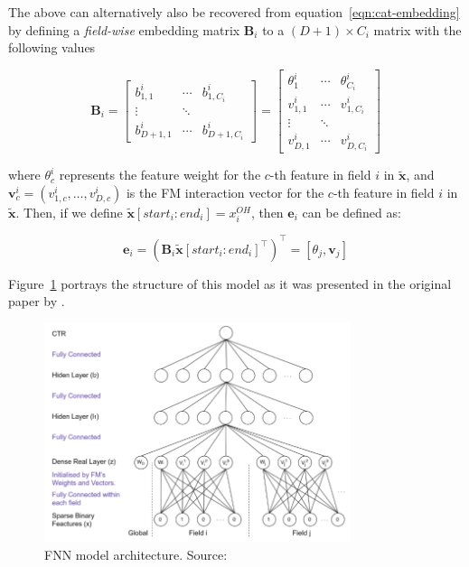 \documentclass{mldsmsc}
\begin{document}
The above can alternatively also be recovered from equation~\ref{eqn:cat-embedding} by
defining a \emph{field-wise} embedding matrix $\mathbf{B}_i$ to a $(D+1) \times C_i$ matrix with the following
values

\begin{equation*}
\mathbf{B}_i = \begin{bmatrix}
    b_{1,1}^i & \cdots & b_{1 ,C_i}^i\\
    \vdots & \ddots & \\
    b_{D+1, 1}^i & \cdots & b_{D+1, C_i}^i
    \end{bmatrix}
= \begin{bmatrix}
    \theta_{1}^{i} & \cdots & \theta_{C_i}^{i}\\
    v_{1,1}^i & \cdots & v_{1,C_i}^i \\
    \vdots & \ddots & \\
    v_{D,1}^{i
    }& \cdots & v_{D,C_i}^{i}
    \end{bmatrix}
\end{equation*}

where $\theta_{c}^i$ represents the feature weight for the $c$-th feature in field $i$ in $\tilde{\mathbf{x}}$,
and $\mathbf{v}_{c}^i = \left(v_{1,c}^i, \ldots, v_{D,c}^i\right)$ is the FM interaction vector for the
$c$-th feature in field $i$ in $\tilde{\mathbf{x}}$. Then, if we define $\tilde{\mathbf{x}}[start_i : end_i]
= x_i^{OH}$, then $\mathbf{e}_i$ can be defined as:

\begin{equation*}
    \mathbf{e}_i = \left(\mathbf{B}_i \tilde{\mathbf{x}}[start_i : end_i]^{\intercal}\right)^{\intercal}
    = \left[\theta_j, \mathbf{v}_j\right] 
\end{equation*}

Figure~\ref{fig:fnn} portrays the structure of this model as it was presented in the original
paper by \cite{RefWorks:zhang2016deep}.

\begin{figure}[h]
    \centering
    \includegraphics[width=0.8\textwidth]{../figures/fnn.png}
    \caption{FNN model architecture. Source: \citep{RefWorks:zhang2016deep}}
    \label{fig:fnn}
\end{figure}
\end{document}
